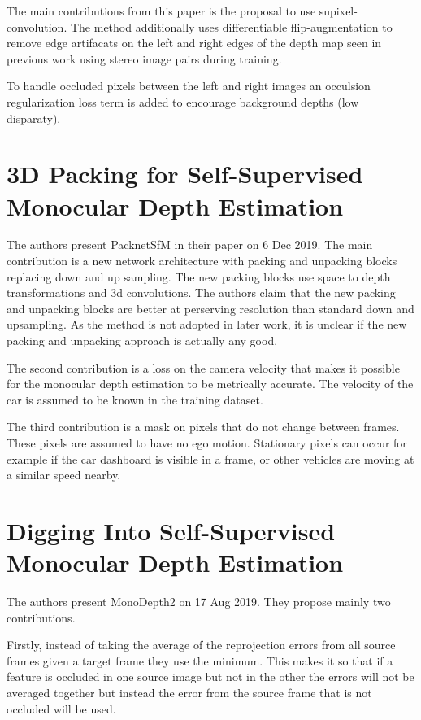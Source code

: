 The main contributions from this paper is the proposal to use supixel-convolution. The method additionally uses differentiable flip-augmentation to remove edge artifacats on the left and right edges of the depth map seen in previous work using stereo image pairs during training.

To handle occluded pixels between the left and right images an occulsion regularization loss term is added to encourage background depths (low disparaty).

\section{3D Packing for Self-Supervised Monocular Depth Estimation \cite{packnet}}
The authors present PacknetSfM in their paper on 6 Dec 2019. The main contribution is a new network architecture with packing and unpacking blocks replacing down and up sampling. The new packing blocks use space to depth transformations and 3d convolutions. The authors claim that the new packing and unpacking blocks are better at perserving resolution than standard down and upsampling. As the method is not adopted in later work, it is unclear if the new packing and unpacking approach is actually any good.

The second contribution is a loss on the camera velocity that makes it possible for the monocular depth estimation to be metrically accurate. The velocity of the car is assumed to be known in the training dataset.

The third contribution is a mask on pixels that do not change between frames. These pixels are assumed to have no ego motion. Stationary pixels can occur for example if the car dashboard is visible in a frame, or other vehicles are moving at a similar speed nearby.

\section{Digging Into Self-Supervised Monocular Depth Estimation \cite{monodepth2}}
The authors present MonoDepth2 on 17 Aug 2019. They propose mainly two contributions.

Firstly, instead of taking the average of the reprojection errors from all source frames given a target frame they use the minimum. This makes it so that if a feature is occluded in one source image but not in the other the errors will not be averaged together but instead the error from the source frame that is not occluded will be used.

